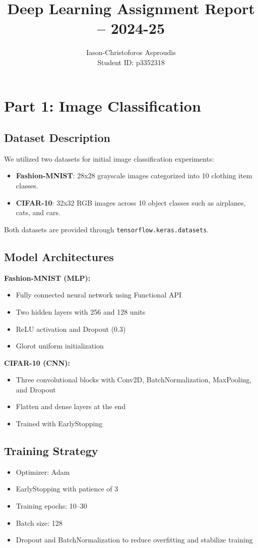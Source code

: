 \documentclass[11pt]{article}
\title{\textbf{Deep Learning Assignment Report -- 2024-25}}
\author{Iason-Christoforos Asproudis\\Student ID: p3352318}
\date{}
\begin{document}
\maketitle

\section*{Part 1: Image Classification}

\subsection*{Dataset Description}
We utilized two datasets for initial image classification experiments:
\begin{itemize}
    \item \textbf{Fashion-MNIST}: 28x28 grayscale images categorized into 10 clothing item classes.
    \item \textbf{CIFAR-10}: 32x32 RGB images across 10 object classes such as airplanes, cats, and cars.
\end{itemize}
Both datasets are provided through \texttt{tensorflow.keras.datasets}.

\subsection*{Model Architectures}

\textbf{Fashion-MNIST (MLP):}
\begin{itemize}
    \item Fully connected neural network using Functional API
    \item Two hidden layers with 256 and 128 units
    \item ReLU activation and Dropout (0.3)
    \item Glorot uniform initialization
\end{itemize}

\textbf{CIFAR-10 (CNN):}
\begin{itemize}
    \item Three convolutional blocks with Conv2D, BatchNormalization, MaxPooling, and Dropout
    \item Flatten and dense layers at the end
    \item Trained with EarlyStopping
\end{itemize}

\subsection*{Training Strategy}
\begin{itemize}
    \item Optimizer: Adam
    \item EarlyStopping with patience of 3
    \item Training epochs: 10--30
    \item Batch size: 128
    \item Dropout and BatchNormalization to reduce overfitting and stabilize training
\end{itemize}
\end{document}

